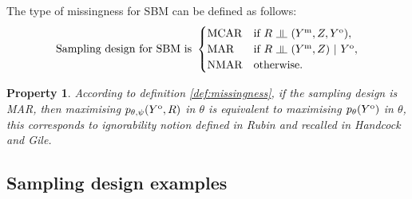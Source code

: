 \documentclass[]{imsart}
\newcommand{\indep}{\rotatebox[origin=c]{90}{$\models$}}
\newcommand{\1}{\mathds{1}}
\newcommand{\MA}{Y}
\newcommand{\MAO}{\MA^\text{\rm o}}
\newcommand{\MAM}{\MA^\text{\rm m}}
\newcommand{\node}{\mathcal{N}}
\numberwithin{equation}{section}
\theoremstyle{plain}
\newtheorem{property}[thm]{Property}
\theoremstyle{remark}
\begin{document}
%        


The type of  missingness for SBM  can be
defined as follows:
\begin{equation}
  \label{def:missingness}
  \text{Sampling design for SBM is }
  \begin{cases}
    \text{MCAR} & \text{if } R \ \indep \ (\MAM, Z, \MAO),\\
    \text{MAR} & \text{if } R \ \indep \ (\MAM,Z) \ | \ \MAO,\\
    \text{NMAR} & \text{otherwise}.\\
  \end{cases}
\end{equation}

\begin{property}\label{prop:mar} According to definition
  \eqref{def:missingness}, if the sampling design is MAR, then maximising $p_{\theta, \psi}(\MAO,R)$  in $\theta$  is equivalent  to maximising $p_{\theta}(\MAO)$ in $\theta$, this corresponds to ignorability notion defined in Rubin and recalled in  Handcock and Gile.
\label{MAR}
\end{property}

\subsection{Sampling design examples}
\end{document}
